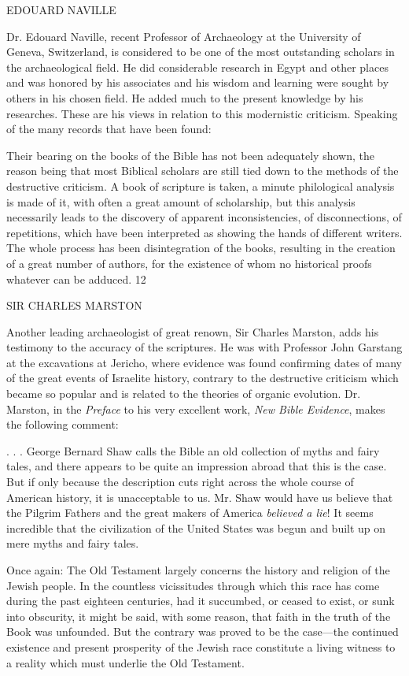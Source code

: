 EDOUARD NAVILLE

Dr. Edouard Naville, recent Professor of Archaeology at the University of Geneva,
Switzerland, is considered to be one of the most outstanding scholars in the archaeological
field. He did considerable research in Egypt and other places and was honored by his
associates and his wisdom and learning were sought by others in his chosen field. He added
much to the present knowledge by his researches. These are his views in relation to this
modernistic criticism. Speaking of the many records that have been found:

Their bearing on the books of the Bible has not been adequately shown, the reason being that
most Biblical scholars are still tied down to the methods of the destructive criticism. A book
of scripture is taken, a minute philological analysis is made of it, with often a great amount of
scholarship, but this analysis necessarily leads to the discovery of apparent inconsistencies,
of disconnections, of repetitions, which have been interpreted as showing the hands of
different writers. The whole process has been disintegration of the books, resulting in the
creation of a great number of authors, for the existence of whom no historical proofs
whatever can be adduced. 12

SIR CHARLES MARSTON

Another leading archaeologist of great renown, Sir Charles Marston, adds his testimony to
the accuracy of the scriptures. He was with Professor John Garstang at the excavations at
Jericho, where evidence was found confirming dates of many of the great events of Israelite
history, contrary to the destructive criticism which became so popular and is related to the
theories of organic evolution. Dr. Marston, in the \textit{Preface} to his very excellent work, \textit{New
Bible Evidence}, makes the following comment:

. . . George Bernard Shaw calls the Bible an old collection of myths and fairy tales, and there
appears to be quite an impression abroad that this is the case. But if only because the
description cuts right across the whole course of American history, it is unacceptable to us.
Mr. Shaw would have us believe that the Pilgrim Fathers and the great makers of America
\textit{believed a lie}! It seems incredible that the civilization of the United States was begun and
built up on mere myths and fairy tales.

Once again: The Old Testament largely concerns the history and religion of the Jewish
people. In the countless vicissitudes through which this race has come during the past
eighteen centuries, had it succumbed, or ceased to exist, or sunk into obscurity, it might be
said, with some reason, that faith in the truth of the Book was unfounded. But the contrary
was proved to be the case—the continued existence and present prosperity of the Jewish race
constitute a living witness to a reality which must underlie the Old Testament.

